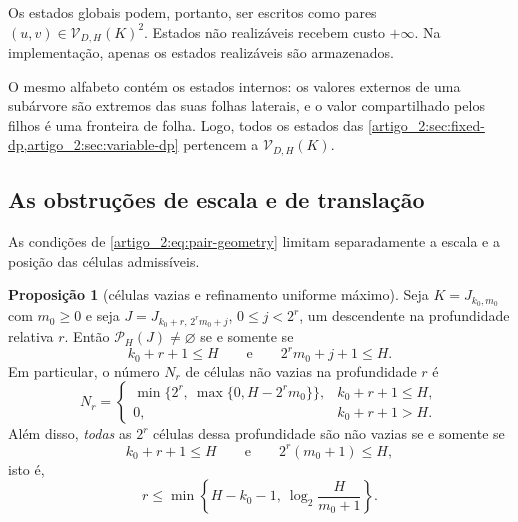 \documentclass[12pt,a4paper]{article}
\theoremstyle{preciso}
\theoremstyle{definition}
\newcommand{\Values}{\mathcal{V}}
\newcommand{\Pairs}{\mathcal{P}}
\theoremstyle{preciso}
\theoremstyle{preciso}
\theoremstyle{preciso}
\newtheorem{proposition}[teorema]{Proposição}
\theoremstyle{preciso}
\theoremstyle{definition}
\theoremstyle{preciso}
\theoremstyle{definition}
\theoremstyle{preciso}
\theoremstyle{preciso}
\theoremstyle{definition}
\begin{document}
Os estados globais podem, portanto, ser escritos como pares
$(u,v)\in\Values_{D,H}(K)^2$. Estados não realizáveis recebem custo
$+\infty$. Na implementação, apenas os estados realizáveis são armazenados.

O mesmo alfabeto contém os estados internos: os valores externos de uma subárvore são extremos das suas folhas laterais, e o valor compartilhado pelos filhos é uma fronteira de folha. Logo, todos os estados das \cref{artigo_2:sec:fixed-dp,artigo_2:sec:variable-dp} pertencem a $\Values_{D,H}(K)$.

\subsection{As obstruções de escala e de translação}

As condições de \eqref{artigo_2:eq:pair-geometry} limitam separadamente a escala e a posição das células admissíveis.

\begin{proposition}[células vazias e refinamento uniforme máximo]\label{map:artigo_2:4.5}
\label{artigo_2:prop:translation-obstruction}
Seja $K=J_{k_0,m_0}$ com $m_0\ge0$ e seja
$J=J_{k_0+r,\,2^rm_0+j}$, $0\le j<2^r$, um descendente na profundidade
relativa $r$. Então $\Pairs_H(J)\ne\varnothing$ se e somente se
\begin{equation}
 k_0+r+1\le H
 \qquad\text{e}\qquad
 2^rm_0+j+1\le H.
 \label{artigo_2:eq:two-obstructions}
\end{equation}
Em particular, o número $N_r$ de células não vazias na profundidade $r$ é
\begin{equation}
 N_r=
 \begin{cases}
 \min\{2^r,\ \max\{0,H-2^rm_0\}\},&k_0+r+1\le H,\\
 0,&k_0+r+1>H.
 \end{cases}
 \label{artigo_2:eq:nonempty-cell-count}
\end{equation}
Além disso, \emph{todas} as $2^r$ células dessa profundidade são não vazias
se e somente se
\begin{equation}
 k_0+r+1\le H
 \qquad\text{e}\qquad
 2^r(m_0+1)\le H,
 \label{artigo_2:eq:uniform-refinement-conditions}
\end{equation}
isto é,
\begin{equation}
 r\le
 \min\!\left\{H-k_0-1,\ \log_2\frac{H}{m_0+1}\right\}.
 \label{artigo_2:eq:uniform-refinement-depth}
\end{equation}
\end{proposition}
\end{document}
